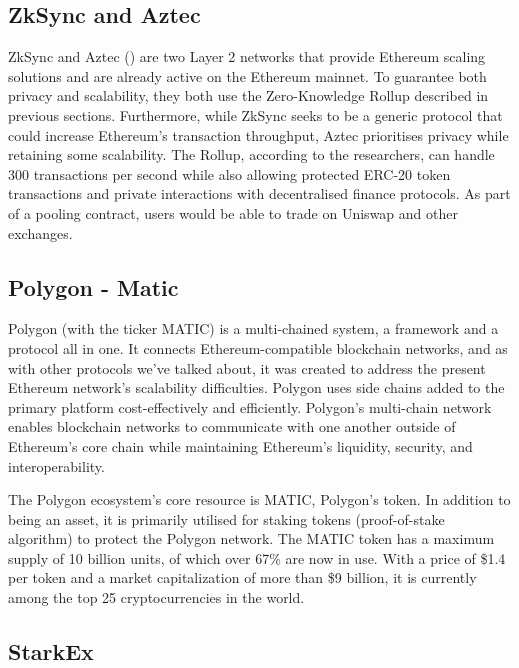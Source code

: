 \subsection{ZkSync and Aztec}

ZkSync \cite{httpsmatter-labsio_zksync_nodate} and Aztec (\cite{noauthor_aztec_nodate}) are two Layer 2 networks that provide Ethereum scaling solutions and are already active on the Ethereum mainnet. To guarantee both privacy and scalability, they both use the Zero-Knowledge Rollup described in previous sections. Furthermore, while ZkSync seeks to be a generic protocol that could increase Ethereum's transaction throughput, Aztec prioritises privacy while retaining some scalability\cite{noauthor_aztec_nodate}. The Rollup, according to the researchers, can handle 300 transactions per second while also allowing protected ERC-20 token transactions and private interactions with decentralised finance protocols. As part of a pooling contract, users would be able to trade on Uniswap and other exchanges.

\subsection{Polygon - Matic}
Polygon (with the ticker MATIC)  \cite{noauthor_polygon_nodate} is a multi-chained system, a framework and a protocol all in one. It connects Ethereum-compatible blockchain networks, and as with other protocols we've talked about, it was created to address the present Ethereum network's scalability difficulties\cite{noauthor_polygon_2021}. Polygon uses side chains added to the primary platform cost-effectively and efficiently. Polygon's multi-chain network enables blockchain networks to communicate with one another outside of Ethereum's core chain while maintaining Ethereum's liquidity, security, and interoperability.

The Polygon ecosystem's core resource is MATIC, Polygon's token. In addition to being an asset, it is primarily utilised for staking tokens (proof-of-stake algorithm) to protect the Polygon network. The MATIC token has a maximum supply of 10 billion units, of which over 67\% are now in use. With a price of \$1.4 per token and a market capitalization of more than \$9 billion, it is currently among the top 25 cryptocurrencies in the world.

\subsection{StarkEx}


